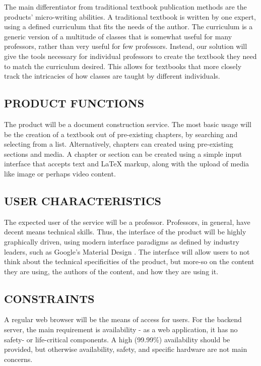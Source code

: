 \documentclass[onecolumn, draftclsnofoot,10pt, compsoc]{IEEEtran}
\begin{document}
{\noindent
The main differentiator from traditional textbook publication methods are the products'
micro-writing abilities. A traditional textbook is written by one expert, using a defined
curriculum that fits the needs of the author. The curriculum is a generic version of a
multitude of classes that is somewhat useful for many professors, rather than very useful
for few professors. Instead, our solution will give the tools necessary for individual
professors to create the textbook they need to match the curriculum desired. This allows
for textbooks that more closely track the intricacies of how classes are taught by
different individuals.}

\subsection[PRODUCT FUNCTIONS]{PRODUCT FUNCTIONS}

{\noindent
The product will be a document construction service. The most basic usage will be the
creation of a textbook out of pre-existing chapters, by searching and selecting from a
list. Alternatively, chapters can created using pre-existing sections and media.
A chapter or section can be created using a simple input interface that
accepts text and LaTeX markup, along with the upload of media like image or
perhaps video content.}

\subsection[USER CHARACTERISTICS]{USER CHARACTERISTICS}

{\noindent
The expected user of the service will be a professor. Professors, in general, have
decent means technical skills. Thus, the interface of the product
will be highly graphically driven, using modern interface paradigms as defined
by industry leaders, such as Google's Material Design \cite{GoogleMaterial}.
The interface will allow users to not think about the technical specificities of the product,
but more-so on the content they are using, the authors of the content, and how they are using it.}

\subsection[CONSTRAINTS]{CONSTRAINTS}

{\noindent
A regular web browser will be the means of access for users. For the backend
server, the main requirement is availability - as a web application, it has no
safety- or life-critical components. A high (99.99\%) availability should be provided,
but otherwise availability, safety, and specific hardware are not main concerns.}
\end{document}
